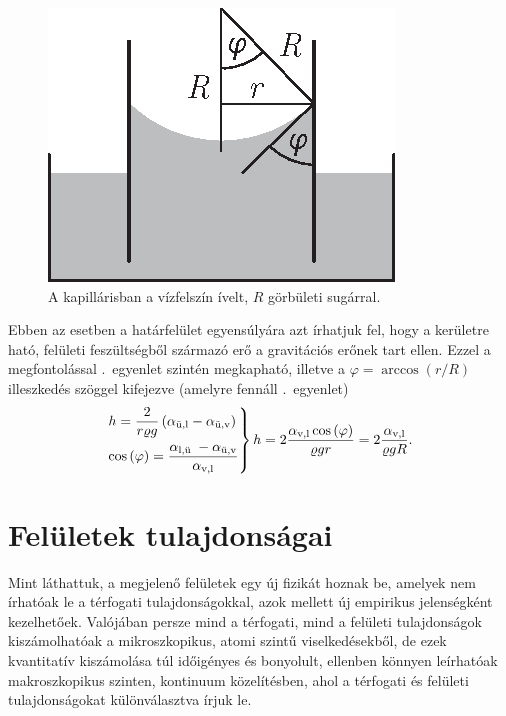 \documentclass[12pt,a4paper]{scrartcl}
\begin{document}
\begin{figure}[htb]
	\begin{center}
		\includegraphics[scale=1]{kapillaris_emelkedes_illeszkedesi_szog.eps}
		\caption{A kapillárisban a vízfelszín ívelt, $R$ görbületi sugárral. }
		\label{fig:kapillaris_illeszkedesi_szog}
	\end{center}
\end{figure}
\FloatBarrier

Ebben az esetben a határfelület egyensúlyára azt írhatjuk fel, hogy a kerületre ható, felületi feszültségből származó erő a gravitációs erőnek tart ellen. Ezzel a megfontolással \az{\eqref{eq:kapillaris_emelkedes}}.\ egyenlet szintén megkapható, illetve a $\varphi  = \arccos \left( {r/R} \right)$ illeszkedés szöggel kifejezve (amelyre fennáll \az{\eqref{eq:illeszkedesi_szog}}.\ egyenlet)
\begin{equation}
\left. \begin{gathered}
  h = \frac{2}{{r\varrho g}}\left( {{\alpha _{{\text{ü,l}}}} - {\alpha _{{\text{ü,v}}}}} \right) \hfill \\
  \cos {\left( \varphi  \right)}  = \frac{{{\alpha _{{\text{l,ü }}}} - {\alpha _{{\text{ü,v}}}}}}{{{\alpha _{{\text{v,l}}}}}} \hfill \\ 
\end{gathered}  \right\}h = 2\frac{{{\alpha _{{\text{v,l}}}}\cos \left( \varphi  \right)}}{{\varrho gr}} = 2\frac{{{\alpha _{{\text{v,l}}}}}}{{\varrho gR}}.
\end{equation}



\section{Felületek tulajdonságai}
Mint láthattuk, a megjelenő felületek egy új fizikát hoznak be, amelyek nem írhatóak le a térfogati tulajdonságokkal, azok mellett új empirikus jelenségként kezelhetőek. Valójában persze mind a térfogati, mind a felületi tulajdonságok kiszámolhatóak a mikroszkopikus, atomi szintű viselkedésekből, de ezek kvantitatív kiszámolása túl időigényes és bonyolult, ellenben könnyen leírhatóak makroszkopikus szinten, kontinuum közelítésben, ahol a térfogati és felületi tulajdonságokat különválasztva írjuk le.
\end{document}
